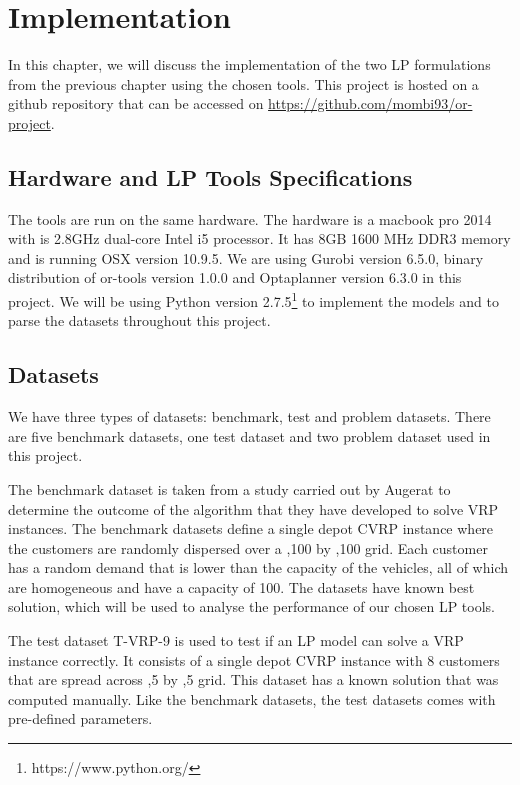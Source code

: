 \chapter{Implementation}
In this chapter, we will discuss the implementation
of the two LP formulations from the previous chapter using the chosen tools.
This project is hosted on a github repository that can be accessed on \url{https://github.com/mombi93/or-project}.

\section{Hardware and LP Tools Specifications}
The tools are run on the same hardware. The hardware is a macbook pro 2014 with is 2.8GHz dual-core Intel i5 processor. It has
8GB 1600 MHz DDR3 memory and is running OSX version 10.9.5. We are using Gurobi version 6.5.0, binary distribution of or-tools version 1.0.0
and Optaplanner version 6.3.0 in this project. We will be using Python version 2.7.5\footnote{https://www.python.org/}
 to implement the models and to parse the datasets throughout this project.

\section{Datasets}
We have three types of datasets: benchmark, test and problem datasets. There are five benchmark datasets, one test dataset and two problem dataset used in this project.

The benchmark dataset is taken from a study carried out
by Augerat \cite{Augerat1998} to determine the outcome of the algorithm that they have developed to solve VRP instances.
The benchmark datasets define a single depot CVRP instance where the customers are randomly dispersed over a ,100\rbrack \hspace{0.025cm} by ,100\rbrack \hspace{0.025cm} grid.
Each customer has a random demand that is lower than the capacity of the vehicles, all of which are homogeneous and have a capacity of 100.
The datasets have known best solution, which will be used to analyse the performance of our chosen LP tools.

The test dataset T-VRP-9 is used to test if an LP model can solve a VRP instance correctly. It consists of a single depot CVRP
instance with 8 customers that are spread across ,5\rbrack \hspace{0.025cm} by ,5\rbrack \hspace{0.025cm} grid.
This dataset has a known solution that was computed manually. Like the benchmark
datasets, the test datasets comes with pre-defined parameters.

